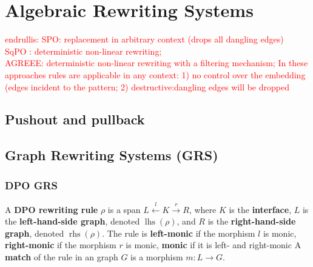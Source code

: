 


\chapter{Algebraic Rewriting Systems} 
    \label{sec:grs}
    \textcolor{red}{endrullis: 
    SPO: replacement in arbitrary context (drops all dangling edges)\\
    SqPO : deterministic non-linear rewriting;\\
    AGREEE: deterministic non-linear rewriting with a filtering mechanism;
    In these approaches rules are applicable in any context: 1) no control over the embedding (edges incident to the pattern; 2) destructive:dangling edges will be dropped
    }
    
    \section{Pushout and pullback}
        \label{sec:category_theory}
        
    
    \section{Graph Rewriting Systems (GRS)} 
    
    \subsection{DPO GRS}
    \begin{definition}
        \label{def:grs:dpo_rule}
      A \textbf{DPO rewriting rule} $\rho$ is a span \( L \overset{l}{\leftarrow} K \overset{r}{\rightarrow} R \), where \( K \) is the \textbf{interface}, \( L \) is the \textbf{left-hand-side graph}, denoted \( \operatorname{lhs}(\rho) \), and \( R \) is the \textbf{right-hand-side graph}, denoted \( \operatorname{rhs}(\rho) \). The rule is \textbf{left-monic} if the morphism \( l \) is monic, \textbf{right-monic} if the morphism \( r \) is monic, \textbf{monic} if it is left- and right-monic   
      A \textbf{match} of the rule in an graph \( G \) is a morphism \( m: L \rightarrow G \).   
      \end{definition}
    
